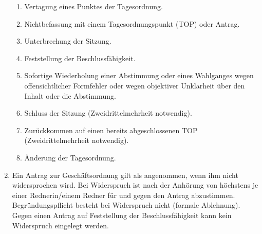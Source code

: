 \begin{enumerate}
\begin{enumerate}
		\item Vertagung eines Punktes der Tagesordnung.
		\item Nichtbefassung mit einem Tagesordnungspunkt (TOP) oder Antrag.
		\item Unterbrechung der Sitzung.
		\item Feststellung der Beschlussfähigkeit.
		\item Sofortige Wiederholung einer Abstimmung oder eines Wahlganges wegen offensichtlicher Formfehler oder wegen objektiver Unklarheit über den Inhalt oder die Abstimmung.
		\item Schluss der Sitzung (Zweidrittelmehrheit notwendig).
		\item Zurückkommen auf einen bereits abgeschlossenen TOP (Zweidrittelmehrheit notwendig).
		\item Änderung der Tagesordnung.
	\end{enumerate}
	\item Ein Antrag zur Geschäftsordnung gilt als angenommen, wenn ihm nicht widersprochen wird.
	Bei Widerspruch ist nach der Anhörung von höchstens je einer Rednerin/einem Redner für und gegen den Antrag abzustimmen.
	Begründungspflicht besteht bei Widerspruch nicht (formale Ablehnung).
	Gegen einen Antrag auf Feststellung der Beschlussfähigkeit kann kein Widerspruch eingelegt werden.
\end{enumerate}


